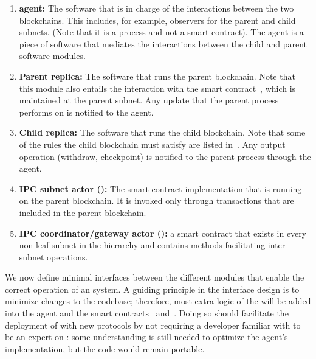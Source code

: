 \begin{enumerate}
    \item \textbf{\ipc agent:} The software that is in charge of the interactions between the two blockchains. This includes, for example, observers for the parent and child subnets. (Note that it is a process and not a smart contract). The \ipc agent is a piece of software that mediates the interactions between the child and parent \smr software modules.    
    \item \textbf{Parent \smr replica:} The software that runs the parent blockchain. Note that this module also entails the interaction with the \ipc smart contract~\sa, which is maintained at the parent subnet. Any update that the parent process performs on \sa is notified to the \ipc agent.
    \item \textbf{Child \smr replica:} The software that runs the child blockchain. Note that some of the rules the child blockchain must satisfy are listed in~\sa. Any output operation (withdraw, checkpoint) is notified to the parent process through the \ipc agent. 
    \item \textbf{IPC subnet actor (\sa):} The smart contract implementation that is running on the parent blockchain. It is invoked only through transactions that are included in the parent blockchain.
    \item \textbf{IPC coordinator/gateway actor (\gw):} a smart contract that exists in every non-leaf subnet in the \ipc hierarchy and contains methods facilitating inter-subnet operations.	
\end{enumerate}


We now define minimal interfaces between the different modules that enable the correct operation of an \ipcFull system.
A guiding principle in the interface design is to minimize changes to the \smr codebase; therefore, most extra logic of the \ipc will be added into the \ipc agent and the smart contracts \sa~and~\gw. Doing so should facilitate the deployment of \ipc with new \smr protocols by not requiring a developer familiar with \ipc to be an expert on \smr: some understanding is still needed to optimize the agent's implementation, but the \smr code would remain portable.

